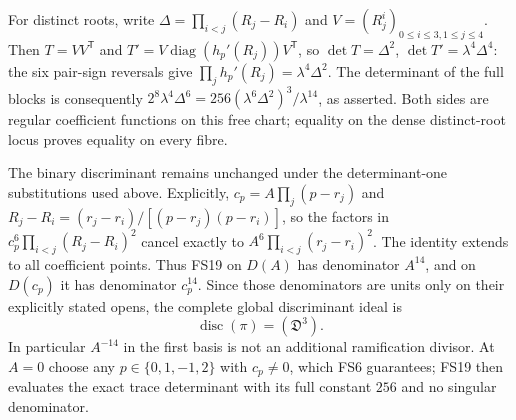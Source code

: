 \documentclass[11pt]{article}
\newcommand{\diag}{\operatorname{diag}}
\begin{document}
For distinct roots, write
$\Delta=\prod_{i<j}(R_j-R_i)$ and
$V=(R_j^i)_{0\le i\le3,1\le j\le4}$.
Then $T=VV^{\mathsf T}$ and
$T'=V\diag(h_p'(R_j))V^{\mathsf T}$, so
$\det T=\Delta^2$, $\det T'=\lambda^4\Delta^4$:
the six pair-sign reversals give
$\prod_j h_p'(R_j)=\lambda^4\Delta^2$.
The determinant of the full blocks is consequently
$2^8\lambda^4\Delta^6
=256(\lambda^6\Delta^2)^3/\lambda^{14}$, as asserted.
Both sides are regular coefficient functions on this free
chart; equality on the dense distinct-root locus proves
equality on every fibre.

The binary discriminant remains unchanged under the
determinant-one substitutions used above. Explicitly,
$c_p=A\prod_j(p-r_j)$ and
$R_j-R_i=(r_j-r_i)/[(p-r_j)(p-r_i)]$, so the factors
in $c_p^6\prod_{i<j}(R_j-R_i)^2$ cancel exactly to
$A^6\prod_{i<j}(r_j-r_i)^2$. The identity extends to all
coefficient points. Thus FS19 on $D(A)$ has denominator
$A^{14}$, and on $D(c_p)$ it has denominator $c_p^{14}$.
Since those denominators are units only on their explicitly
stated opens, the complete global discriminant ideal is
\begin{equation}
\operatorname{disc}(\pi)=(\mathfrak D^3).
\tag{FS20}
\end{equation}
In particular $A^{-14}$ in the first basis is not an
additional ramification divisor. At $A=0$ choose any
$p\in\{0,1,-1,2\}$ with $c_p\ne0$, which FS6 guarantees;
FS19 then evaluates the exact trace determinant with its
full constant $256$ and no singular denominator.
\end{document}
